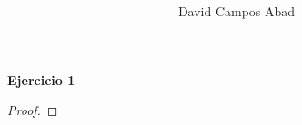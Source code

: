 \documentclass{article}
\title{%
    }
\date{}
\author{David Campos Abad}
\begin{document}
\maketitle

\noindent\large\textbf{Ejercicio 1}

\begin{proof}
    
\end{proof}
\end{document}
